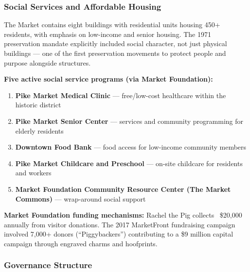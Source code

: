 \documentclass[11pt,letterpaper]{article}
\begin{document}
\subsubsection{Social Services and Affordable Housing}

The Market contains eight buildings with residential units housing 450+ residents, with emphasis on low-income and senior housing. The 1971 preservation mandate explicitly included social character, not just physical buildings --- one of the first preservation movements to protect people and purpose alongside structures.

\textbf{Five active social service programs (via Market Foundation):}
\begin{enumerate}[noitemsep]
  \item \textbf{Pike Market Medical Clinic} --- free/low-cost healthcare within the historic district
  \item \textbf{Pike Market Senior Center} --- services and community programming for elderly residents
  \item \textbf{Downtown Food Bank} --- food access for low-income community members
  \item \textbf{Pike Market Childcare and Preschool} --- on-site childcare for residents and workers
  \item \textbf{Market Foundation Community Resource Center (The Market Commons)} --- wrap-around social support
\end{enumerate}

\textbf{Market Foundation funding mechanisms:} Rachel the Pig collects ~\$20,000 annually from visitor donations. The 2017 MarketFront fundraising campaign involved 7,000+ donors (``Piggybackers'') contributing to a \$9 million capital campaign through engraved charms and hoofprints.

\subsubsection{Governance Structure}
\end{document}
